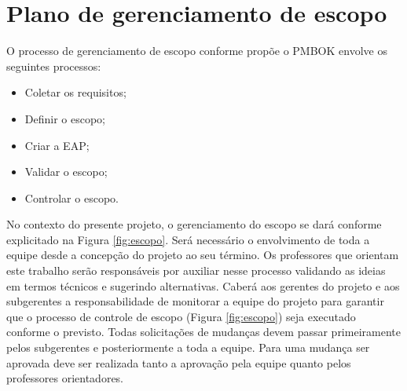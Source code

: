 \section{Plano de gerenciamento de escopo}

O processo de gerenciamento de escopo conforme propõe o PMBOK envolve os seguintes processos:

\begin{itemize}
\item Coletar os requisitos;
\item Definir o escopo;
\item Criar a EAP;
\item Validar o escopo;
\item Controlar o escopo.
\end{itemize}

No contexto do presente projeto, o gerenciamento do escopo se dará conforme explicitado na Figura \ref{fig:escopo}. Será necessário o envolvimento de toda a equipe desde a concepção do projeto ao seu término. Os professores que orientam este trabalho serão responsáveis por auxiliar nesse processo validando as ideias em termos técnicos e sugerindo alternativas. Caberá aos gerentes do projeto e aos subgerentes a responsabilidade de monitorar a equipe do projeto para garantir que o processo de controle de escopo (Figura \ref{fig:escopo}) seja executado conforme o previsto. Todas solicitações de mudanças devem passar primeiramente pelos subgerentes e posteriormente a toda a equipe. Para uma mudança ser aprovada deve ser realizada tanto a aprovação pela equipe quanto pelos professores orientadores.


